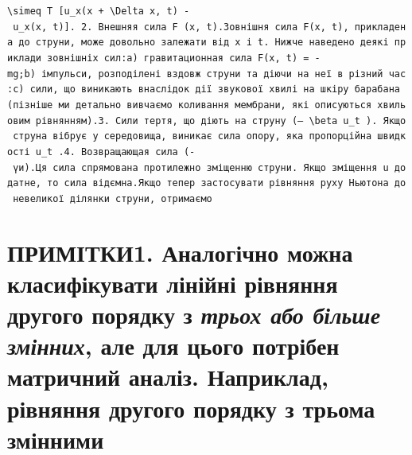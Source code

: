 \documentclass[
  ukrainian,
]{article}
\begin{document}
\texttt{\textquotesingle{}\textbackslash{}simeq\ T\ {[}u\_x(x\ +\ \textbackslash{}Delta\ x,\ t)\ -\ u\_x(x,\ t){]}.\textquotesingle{}\ 2.\ Внешняя\ сила\ \textquotesingle{}F\ (x,\ t)\textquotesingle{}.Зовнішня\ сила\ \textquotesingle{}F(x,\ t)\textquotesingle{},\ прикладена\ до\ струни,\ може\ довольно\ залежати\ від\ x\ і\ t.\ Нижче\ наведено\ деякі\ приклади\ зовнішніх\ сил:а)\ гравитационная\ сила\ \textquotesingle{}F(x,\ t)\textquotesingle{}\ =\ -mg;b)\ імпульси,\ розподілені\ вздовж\ струни\ та\ діючи\ на\ неї\ в\ різний\ час:c)\ сили,\ що\ виникають\ внаслідок\ дії\ звукової\ хвилі\ на\ шкіру\ барабана\ (пізніше\ ми\ детально\ вивчаємо\ коливання\ мембрани,\ які\ описуються\ хвильовим\ рівнянням).3.\ Сили\ тертя,\ що\ діють\ на\ струну\ (—\ \textquotesingle{}\textbackslash{}beta\ u\_t\textquotesingle{}\ ).\ Якщо\ струна\ вібрує\ у\ середовища,\ виникає\ сила\ опору,\ яка\ пропорційна\ швидкості\ \textquotesingle{}u\_t\textquotesingle{}\ .4.\ Возвращающая\ сила\ (-\ үи).Ця\ сила\ спрямована\ протилежно\ зміщенню\ струни.\ Якщо\ зміщення\ u\ додатне,\ то\ сила\ від\textquotesingle{}ємна.Якщо\ тепер\ застосувати\ рівняння\ руху\ Ньютона\ до\ невеликої\ ділянки\ струни,\ отримаємо}

\section{\texorpdfstring{ПРИМІТКИ1. Аналогічно можна класифікувати
лінійні рівняння другого порядку з \emph{трьох або більше змінних}, але
для цього потрібен матричний аналіз. Наприклад, рівняння другого порядку
з трьома
змінними}{ПРИМІТКИ1. Аналогічно можна класифікувати лінійні рівняння другого порядку з трьох або більше змінних, але для цього потрібен матричний аналіз. Наприклад, рівняння другого порядку з трьома змінними}}\label{ux43fux440ux438ux43cux456ux442ux43aux4381.-ux430ux43dux430ux43bux43eux433ux456ux447ux43dux43e-ux43cux43eux436ux43dux430-ux43aux43bux430ux441ux438ux444ux456ux43aux443ux432ux430ux442ux438-ux43bux456ux43dux456ux439ux43dux456-ux440ux456ux432ux43dux44fux43dux43dux44f-ux434ux440ux443ux433ux43eux433ux43e-ux43fux43eux440ux44fux434ux43aux443-ux437-ux442ux440ux44cux43eux445-ux430ux431ux43e-ux431ux456ux43bux44cux448ux435-ux437ux43cux456ux43dux43dux438ux445-ux430ux43bux435-ux434ux43bux44f-ux446ux44cux43eux433ux43e-ux43fux43eux442ux440ux456ux431ux435ux43d-ux43cux430ux442ux440ux438ux447ux43dux438ux439-ux430ux43dux430ux43bux456ux437.-ux43dux430ux43fux440ux438ux43aux43bux430ux434-ux440ux456ux432ux43dux44fux43dux43dux44f-ux434ux440ux443ux433ux43eux433ux43e-ux43fux43eux440ux44fux434ux43aux443-ux437-ux442ux440ux44cux43eux43cux430-ux437ux43cux456ux43dux43dux438ux43cux438}
\end{document}
